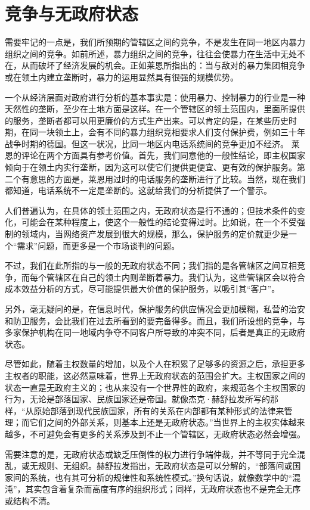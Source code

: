 \section{竞争与无政府状态}
需要牢记的一点是，我们所预期的管辖区之间的竞争，不是发生在同一地区内暴力组织之间的竞争。如前所述，暴力组织之间的竞争，往往会使暴力在生活中无处不在，从而破坏了经济发展的机会。正如莱恩所指出的：当与敌对的暴力集团相竞争或在领土内建立垄断时，暴力的运用显然具有很强的规模优势。

一个从经济层面对政府进行分析的基本事实是：使用暴力、控制暴力的行业是一种天然性的垄断，至少在土地方面是这样。在一个管辖区的领土范围内，里面所提供的服务，垄断者都可以用更廉价的方式生产出来。可以肯定的是，在某些历史时期，在同一块领土上，会有不同的暴力组织竞相要求人们支付保护费，例如三十年战争时期的德国。但这一状况，比同一地区内电话系统间的竞争更加不经济。 莱恩的评论在两个方面具有参考价值。首先，我们同意他的一般性结论，即主权国家倾向于在领土内实行垄断，因为这可以使它们提供更便宜、更有效的保护服务。第二个有意思的方面是，莱恩用过时的电话服务的垄断进行了比较。当然，现在我们都知道，电话系统不一定是垄断的。这就给我们的分析提供了一个警示。

人们普遍认为，在具体的领土范围之内，无政府状态是行不通的；但技术条件的变化，可能会在某种程度上，使这个一般性的结论变得过时。比如说，在一个不受强制的领域内，当网络资产发展到很大的规模，那么，保护服务的定价就更少是一个“需求”问题，而更多是一个市场谈判的问题。

不过，我们在此所指的与一般的无政府状态不同；我们指的是各管辖区之间互相竞争，而每个管辖区在自己的领土内则垄断着暴力。我们认为，这些管辖区会以符合成本效益分析的方式，尽可能提供最大价值的保护服务，以吸引其“客户”。

另外，毫无疑问的是，在信息时代，保护服务的供应情况会更加模糊，私营的治安和防卫服务，会比我们在过去所看到的要完备得多。而且，我们所设想的竞争，与多家保护机构在同一地域内争夺不同客户所导致的冲突不同，后者是真正的无政府状态。

尽管如此，随着主权数量的增加，以及个人在积累了足够多的资源之后，承担更多主权者的职能，这必然意味着，世界上无政府状态的范围会扩大。主权国家之间的状态一直是无政府主义的；也从来没有一个世界性的政府，来规范各个主权国家的行为，无论是部落国家、民族国家还是帝国。就像杰克·赫舒拉发所写的那样，“从原始部落到现代民族国家，所有的关系在内部都有某种形式的法律来管理；而它们之间的外部关系，则基本上还是无政府状态。”当世界上的主权实体越来越多，不可避免会有更多的关系涉及到不止一个管辖区，无政府状态必然会增强。

需要注意的是，无政府状态或缺乏压倒性的权力进行争端仲裁，并不等同于完全混乱，或无规则、无组织。赫舒拉发指出，无政府状态是可以分解的，“部落间或国家间的系统，也有其可分析的规律性和系统性模式。”换句话说，就像数学中的“混沌”，其实包含着复杂而高度有序的组织形式；同样，无政府状态也不是完全无序或结构不清。

